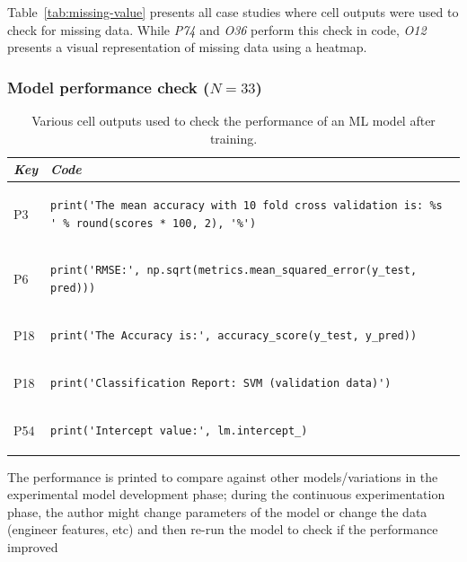 Table~\ref{tab:missing-value} presents all case studies where cell outputs were used to check for missing data. While \emph{P74} and \emph{O36} perform this check in code, \emph{O12} presents a visual representation of missing data using a heatmap.

\subsubsection{Model performance check ($N = 33$)}

\begin{table}
\centering
\caption{Various cell outputs used to check the performance of an ML model after training.}
\begin{tabular}{@{}m{} m{}@{}}
\toprule
\emph{\textbf{Key}}&
\emph{\textbf{Code}}\\
\midrule

P3&
\begin{lstlisting}
print('The mean accuracy with 10 fold cross validation is: %s ' % round(scores * 100, 2), '%')
\end{lstlisting}\\
    
P6&
\begin{lstlisting}
print('RMSE:', np.sqrt(metrics.mean_squared_error(y_test, pred)))
\end{lstlisting}\\

P18&
\begin{lstlisting}
print('The Accuracy is:', accuracy_score(y_test, y_pred))
\end{lstlisting}\\

P18&
\begin{lstlisting}
print('Classification Report: SVM (validation data)')
\end{lstlisting}\\

P54&
\begin{lstlisting}
print('Intercept value:', lm.intercept_)
\end{lstlisting}\\
\end{tabular}
\label{tab:model-perf}
\end{table}

The performance is printed to compare against other models/variations in the experimental model development phase; during the continuous experimentation phase, the author might change parameters of the model or change the data (engineer features, etc) and then re-run the model to check if the performance improved

